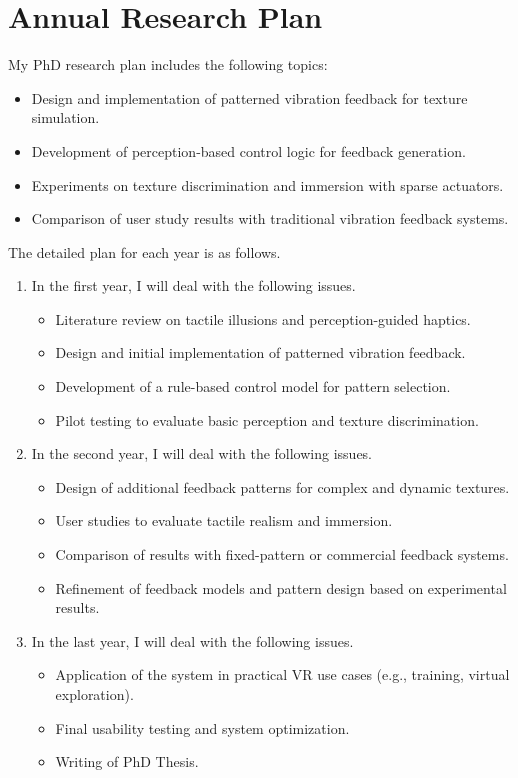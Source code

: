 \documentclass[graybox]{svmult}
\begin{document}
\section{Annual Research Plan}
\label{sec:conc}
My PhD research plan includes the following topics:
\begin{itemize}
	\item Design and implementation of patterned vibration feedback for texture simulation.
	\item Development of perception-based control logic for feedback generation.
	\item Experiments on texture discrimination and immersion with sparse actuators.
	\item Comparison of user study results with traditional vibration feedback systems.
\end{itemize}

The detailed plan for each year is as follows.
\begin{enumerate}
	\item In the first year, I will deal with the following issues.
	      \begin{itemize}
		      \item Literature review on tactile illusions and perception-guided haptics.
		      \item Design and initial implementation of patterned vibration feedback.
		      \item Development of a rule-based control model for pattern selection.
		      \item Pilot testing to evaluate basic perception and texture discrimination.
	      \end{itemize}
	\item In the second year, I will deal with the following issues.
	      \begin{itemize}
		      \item Design of additional feedback patterns for complex and dynamic textures.
		      \item User studies to evaluate tactile realism and immersion.
		      \item Comparison of results with fixed-pattern or commercial feedback systems.
		      \item Refinement of feedback models and pattern design based on experimental results.
	      \end{itemize}
	\item In the last year, I will deal with the following issues.
	      \begin{itemize}
		      \item Application of the system in practical VR use cases (e.g., training, virtual exploration).
		      \item Final usability testing and system optimization.
		      \item Writing of PhD Thesis.
	      \end{itemize}
\end{enumerate}


% 
% 
\end{document}
